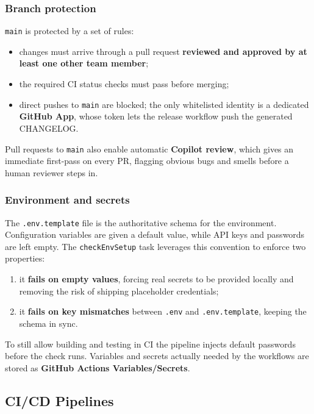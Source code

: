 \subsubsection{Branch protection}

\texttt{main} is protected by a set of rules:
\begin{itemize}
  \item changes must arrive through a pull request \textbf{reviewed and approved by at least one other team member};
  \item the required CI status checks must pass before merging;
  \item direct pushes to \texttt{main} are blocked; the only whitelisted identity is a dedicated \textbf{GitHub App}, whose token lets the release workflow push the generated CHANGELOG.
\end{itemize}

Pull requests to \texttt{main} also enable automatic \textbf{Copilot review}, which gives an immediate first-pass on every PR, flagging obvious bugs and smells before a human reviewer steps in.

\subsubsection{Environment and secrets}

The \texttt{.env.template} file is the authoritative schema for the environment. Configuration variables are given a default value, while API keys and passwords are left empty. The \texttt{checkEnvSetup} task leverages this convention to enforce two properties:
\begin{enumerate}
  \item it \textbf{fails on empty values}, forcing real secrets to be provided locally and removing the risk of shipping placeholder credentials;
  \item it \textbf{fails on key mismatches} between \texttt{.env} and \texttt{.env.template}, keeping the schema in sync.
\end{enumerate}

To still allow building and testing in CI the pipeline injects default passwords before the check runs. Variables and secrets actually needed by the workflows are stored as \textbf{GitHub Actions Variables/Secrets}.

\subsection{CI/CD Pipelines}

